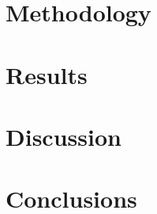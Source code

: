 \documentclass[conference]{IEEEtran}
\begin{document}
\section{Methodology}

\section{Results}

\section{Discussion}

\section{Conclusions}


\end{document}
